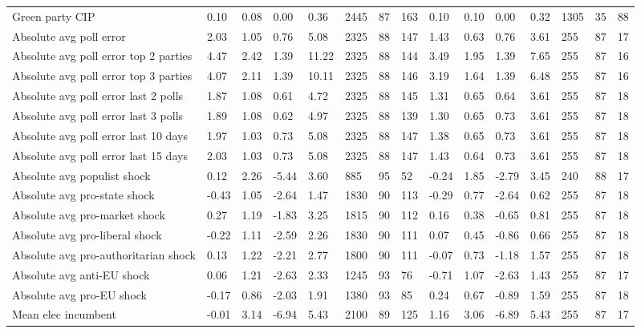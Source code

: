 \begin{longtable}{lllllllllllllll}
Green party CIP & 0.10 & 0.08 & 0.00 & 0.36 & 2445 & 87 & 163 & 0.10 & 0.10 & 0.00 & 0.32 & 1305 & 35 & 88\\
Absolute avg poll error & 2.03 & 1.05 & 0.76 & 5.08 & 2325 & 88 & 147 & 1.43 & 0.63 & 0.76 & 3.61 & 255 & 87 & 17\\
Absolute avg poll error top 2 parties & 4.47 & 2.42 & 1.39 & 11.22 & 2325 & 88 & 144 & 3.49 & 1.95 & 1.39 & 7.65 & 255 & 87 & 16\\
\addlinespace
Absolute avg poll error top 3 parties & 4.07 & 2.11 & 1.39 & 10.11 & 2325 & 88 & 146 & 3.19 & 1.64 & 1.39 & 6.48 & 255 & 87 & 16\\
Absolute avg poll error last 2 polls & 1.87 & 1.08 & 0.61 & 4.72 & 2325 & 88 & 145 & 1.31 & 0.65 & 0.64 & 3.61 & 255 & 87 & 18\\
Absolute avg poll error last 3 polls & 1.89 & 1.08 & 0.62 & 4.97 & 2325 & 88 & 139 & 1.30 & 0.65 & 0.73 & 3.61 & 255 & 87 & 18\\
Absolute avg poll error last 10 days & 1.97 & 1.03 & 0.73 & 5.08 & 2325 & 88 & 147 & 1.38 & 0.65 & 0.73 & 3.61 & 255 & 87 & 18\\
Absolute avg poll error last 15 days & 2.03 & 1.03 & 0.73 & 5.08 & 2325 & 88 & 147 & 1.43 & 0.64 & 0.73 & 3.61 & 255 & 87 & 18\\
\addlinespace
Absolute avg populist shock & 0.12 & 2.26 & -5.44 & 3.60 & 885 & 95 & 52 & -0.24 & 1.85 & -2.79 & 3.45 & 240 & 88 & 17\\
Absolute avg pro-state shock & -0.43 & 1.05 & -2.64 & 1.47 & 1830 & 90 & 113 & -0.29 & 0.77 & -2.64 & 0.62 & 255 & 87 & 18\\
Absolute avg pro-market shock & 0.27 & 1.19 & -1.83 & 3.25 & 1815 & 90 & 112 & 0.16 & 0.38 & -0.65 & 0.81 & 255 & 87 & 18\\
Absolute avg pro-liberal shock & -0.22 & 1.11 & -2.59 & 2.26 & 1830 & 90 & 111 & 0.07 & 0.45 & -0.86 & 0.66 & 255 & 87 & 18\\
Absolute avg pro-authoritarian shock & 0.13 & 1.22 & -2.21 & 2.77 & 1800 & 90 & 111 & -0.07 & 0.73 & -1.18 & 1.57 & 255 & 87 & 18\\
\addlinespace
Absolute avg anti-EU shock & 0.06 & 1.21 & -2.63 & 2.33 & 1245 & 93 & 76 & -0.71 & 1.07 & -2.63 & 1.43 & 255 & 87 & 17\\
Absolute avg pro-EU shock & -0.17 & 0.86 & -2.03 & 1.91 & 1380 & 93 & 85 & 0.24 & 0.67 & -0.89 & 1.59 & 255 & 87 & 18\\
Mean elec incumbent & -0.01 & 3.14 & -6.94 & 5.43 & 2100 & 89 & 125 & 1.16 & 3.06 & -6.89 & 5.43 & 255 & 87 & 17\\

\end{longtable}
